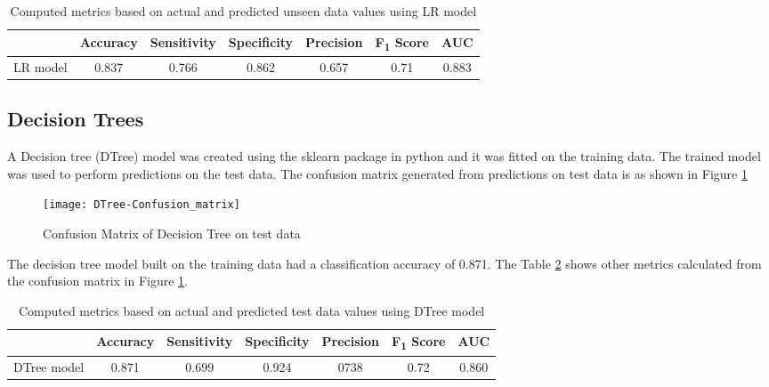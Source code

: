 \documentclass[11pt,openright]{report}
\begin{document}
\begin{table}[!htb]
	\renewcommand{\arraystretch}{1.3}
	\caption{Computed metrics based on actual and predicted unseen data values using LR model}
	\label{table:lr-unseen_metrics_db}
	\centering
	\begin{tabular}{|c|c|c|c|c|c|c|}
    \hline
  	 & \bfseries Accuracy & \bfseries Sensitivity & \bfseries Specificity & \bfseries Precision & \bfseries F\textsubscript{1} Score  & \bfseries AUC\\  
    \hline
	LR model & 0.837 & 0.766 & 0.862 & 0.657 & 0.71 & 0.883 \\ \hline
	\end{tabular} 
\end{table}

\subsection {Decision Trees}
A Decision tree (DTree) model was created using the sklearn package in python and it was fitted on the training data. The trained model was used to perform predictions on the test data. The confusion matrix generated from predictions on test data is as shown in Figure \ref{fig:Dtree_confusion_matrix}

  \begin{figure}[!htb]
	\centering
	\texttt{[image: DTree-Confusion\_matrix]}
	\caption{Confusion Matrix of Decision Tree on test data}
	\label{fig:Dtree_confusion_matrix}
\end{figure} 

The decision tree model built on the training data had a classification accuracy of 0.871. The Table \ref{table:Dtree_confusion_matrix} shows other metrics calculated from the confusion matrix in Figure \ref{fig:Dtree_confusion_matrix}. 
\begin{table} [!htb]
	\renewcommand{\arraystretch}{1.3}
	\caption{Computed metrics based on actual and predicted test data values using DTree model}
	\label{table:Dtree_confusion_matrix}
	\centering
	\begin{tabular}{|c|c|c|c|c|c|c|}
    \hline
  	 & \bfseries Accuracy & \bfseries Sensitivity & \bfseries Specificity & \bfseries Precision & \bfseries F\textsubscript{1} Score  & \bfseries AUC\\  
    \hline
	DTree model & 0.871 & 0.699 & 0.924 & 0738 & 0.72 & 0.860 \\ \hline
	\end{tabular} 
\end{table}
\end{document}
